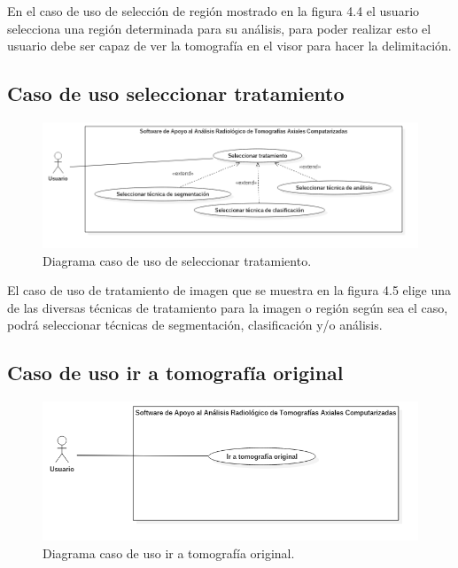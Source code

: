 \documentclass[12pt]{report}
\begin{document}
En el caso de uso de selección de región mostrado en la figura 4.4 el usuario selecciona una región determinada para su análisis, para poder realizar esto el usuario debe ser capaz de ver la tomografía en el visor para hacer la delimitación.

\subsection{Caso de uso seleccionar tratamiento}
\begin{figure}[H]
\centering
\includegraphics[width = 13 cm, height =  10 cm]{TrataCasos}
\caption{Diagrama caso de uso de seleccionar tratamiento.}
\end{figure}

El caso de uso de tratamiento de imagen que se muestra en la figura 4.5 elige una de las diversas técnicas de tratamiento para la imagen o región según sea el caso, podrá seleccionar técnicas de segmentación, clasificación y/o análisis.

\subsection{Caso de uso ir a tomografía original}
\begin{figure}[H]
\centering
\includegraphics[width = 9 cm, height =  7 cm]{origi}
\caption{Diagrama caso de uso ir a tomografía original.}
\end{figure}
\end{document}
